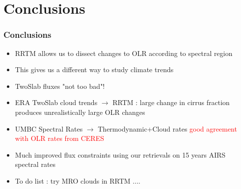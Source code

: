 \documentclass[10pt,t]{beamer}
\begin{document}
\section{Conclusions}
\begin{frame}
  \frametitle{Conclusions}
  \begin{itemize}
  \item RRTM allows us to dissect changes to OLR according to spectral region
  \item This gives us a different way to study climate trends
  \item TwoSlab fluxes "not too bad"!
  \item ERA TwoSlab cloud trends $\rightarrow$ RRTM : large change in cirrus fraction
        produces unrealistically large OLR changes
  \item UMBC Spectral Rates $\rightarrow$ Thermodynamic+Cloud rates \textcolor{red}{good agreement
        with OLR rates from CERES}
  \item Much improved flux constraints using our retrievals on 15 years AIRS spectral rates
  \item To do list : try MRO clouds in RRTM ....
  \end{itemize}
\end{frame}

\end{document}
